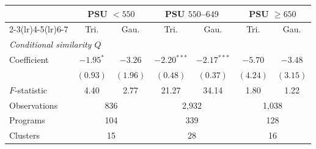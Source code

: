 \begin{tabular}{lcccccc}
\toprule
& \multicolumn{2}{c}{PSU \(<550\)} & \multicolumn{2}{c}{PSU \(550\)--\(649\)} & \multicolumn{2}{c}{PSU \(\geq650\)} \\
\cmidrule(lr){2-3}\cmidrule(lr){4-5}\cmidrule(lr){6-7}
& Tri. & Gau. & Tri. & Gau. & Tri. & Gau. \\
\midrule
\multicolumn{7}{l}{\textit{Conditional similarity \(Q\)}} \\
\addlinespace[2pt]
Coefficient & \(-1.95^{*}\) & \(-3.26\) & \(-2.20^{***}\) & \(-2.17^{***}\) & \(-5.70\) & \(-3.48\) \\
 & \((0.93)\) & \((1.96)\) & \((0.48)\) & \((0.37)\) & \((4.24)\) & \((3.15)\) \\
\(F\)-statistic &  4.40 &  2.77 & 21.27 & 34.14 &  1.80 &  1.22 \\
Observations & \multicolumn{2}{c}{      836} & \multicolumn{2}{c}{    2,932} & \multicolumn{2}{c}{    1,038} \\
Programs & \multicolumn{2}{c}{      104} & \multicolumn{2}{c}{      339} & \multicolumn{2}{c}{      128} \\
Clusters & \multicolumn{2}{c}{       15} & \multicolumn{2}{c}{       28} & \multicolumn{2}{c}{       16} \\
\bottomrule
\end{tabular}
